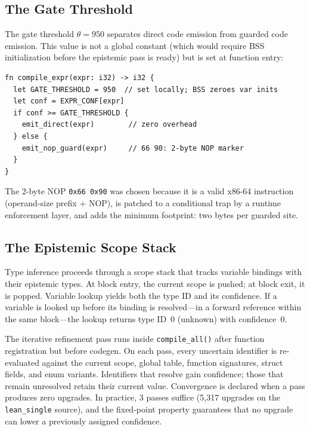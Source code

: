 \documentclass[acmsmall,screen,review,anonymous]{acmart}
\newcommand{\lean}{\texttt{lean\_single}\xspace}
\begin{document}
\subsection{The Gate Threshold}

The gate threshold $\theta = 950$ separates direct code emission from
guarded code emission.
This value is not a global constant (which would require BSS
initialization before the epistemic pass is ready) but is set at
function entry:

\begin{lstlisting}[language=sounio, caption={Gate threshold initialization}]
fn compile_expr(expr: i32) -> i32 {
  let GATE_THRESHOLD = 950  // set locally; BSS zeroes var inits
  let conf = EXPR_CONF[expr]
  if conf >= GATE_THRESHOLD {
    emit_direct(expr)        // zero overhead
  } else {
    emit_nop_guard(expr)     // 66 90: 2-byte NOP marker
  }
}
\end{lstlisting}

The 2-byte NOP \texttt{0x66~0x90} was chosen because it is a valid
x86-64 instruction (operand-size prefix + NOP), is patched to a
conditional trap by a runtime enforcement layer, and adds the minimum
footprint: two bytes per guarded site.

\subsection{The Epistemic Scope Stack}

Type inference proceeds through a scope stack that tracks variable
bindings with their epistemic types.
At block entry, the current scope is pushed; at block exit, it is popped.
Variable lookup yields both the type ID and its confidence.
If a variable is looked up before its binding is resolved---in a
forward reference within the same block---the lookup returns type ID~0
(unknown) with confidence~0.

The iterative refinement pass runs inside \texttt{compile\_all()} after
function registration but before codegen.
On each pass, every uncertain identifier is re-evaluated against the
current scope, global table, function signatures, struct fields,
and enum variants.
Identifiers that resolve gain confidence; those that remain unresolved
retain their current value.
Convergence is declared when a pass produces zero upgrades.
In practice, 3 passes suffice (5,317 upgrades on the \lean source),
and the fixed-point property guarantees that no upgrade can lower
a previously assigned confidence.
\end{document}
